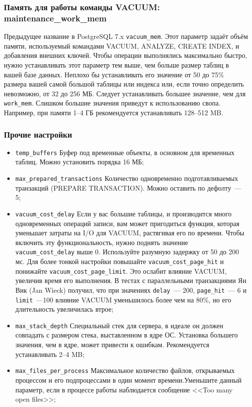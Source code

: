 \subsubsection{Память для работы команды VACUUM: maintenance\_work\_mem}

Предыдущее название в PostgreSQL 7.x \lstinline!vacuum_mem!. Этот параметр задаёт объём памяти, используемый командами VACUUM, ANALYZE, CREATE INDEX, и добавления внешних ключей. Чтобы операции выполнялись максимально быстро, нужно устанавливать этот параметр тем выше, чем больше размер таблиц в вашей базе данных. Неплохо бы устанавливать его значение от 50 до 75\% размера вашей самой большой таблицы или индекса или, если точно определить невозможно, от 32 до 256 МБ. Следует устанавливать большее значение, чем для \lstinline!work_mem!. Слишком большие значения приведут к использованию свопа. Например, при памяти 1--4 ГБ рекомендуется устанавливать 128--512 MB.

\subsubsection{Прочие настройки}

\begin{itemize}
  \item \lstinline!temp_buffers! Буфер под временные объекты, в основном для временных таблиц. Можно установить порядка 16 МБ;
  \item \lstinline!max_prepared_transactions! Количество одновременно подготавливаемых транзакций (PREPARE TRANSACTION). Можно оставить по дефолту~--- 5;
  \item \lstinline!vacuum_cost_delay! Если у вас большие таблицы, и производится много одновременных операций записи, вам может пригодиться функция, которая уменьшает затраты на I/O для VACUUM, растягивая его по времени. Чтобы включить эту функциональность, нужно поднять значение \lstinline!vacuum_cost_delay! выше 0. Используйте разумную задержку от 50 до 200 мс. Для более тонкой настройки повышайте \lstinline!vacuum_cost_page_hit! и понижайте \lstinline!vacuum_cost_page_limit!. Это ослабит влияние VACUUM, увеличив время его выполнения. В тестах с параллельными транзакциями Ян Вик (Jan Wieck) получил, что при значениях \lstinline!delay!~--- 200, \lstinline!page_hit!~--- 6 и \lstinline!limit!~---100 влияние VACUUM уменьшилось более чем на 80\%, но его длительность увеличилась втрое;
  \item \lstinline!max_stack_depth! Специальный стек для сервера, в идеале он должен совпадать с размером стека, выставленном в ядре ОС. Установка большего значения, чем в ядре, может привести к ошибкам. Рекомендуется устанавливать 2--4 MB;
  \item \lstinline!max_files_per_process! Максимальное количество файлов, открываемых процессом и его подпроцессами в один момент времени.Уменьшите данный параметр, если в процессе работы наблюдается сообщение <<Too many open files>>;
\end{itemize}


